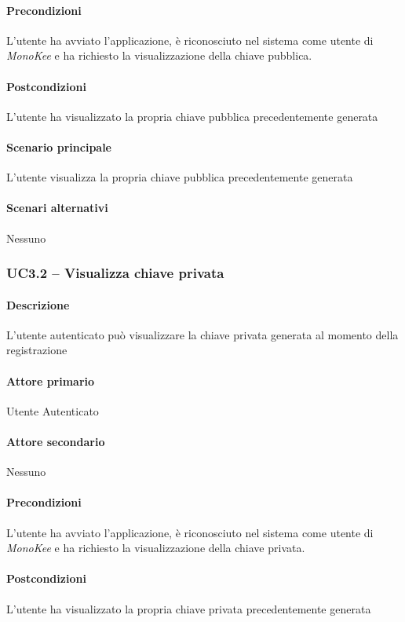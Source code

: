 \paragraph{Precondizioni}  L’utente ha avviato l’applicazione, è riconosciuto nel sistema come utente di \textit{MonoKee} e ha richiesto la visualizzazione della chiave pubblica.
\paragraph{Postcondizioni}  L’utente ha visualizzato la propria chiave pubblica precedentemente generata
\paragraph{Scenario principale}  
L’utente visualizza la propria chiave pubblica precedentemente generata
\paragraph{Scenari alternativi}  Nessuno



\subsubsection{UC3.2 – Visualizza chiave privata}
\paragraph{Descrizione}  L’utente autenticato può visualizzare la chiave privata generata al momento della registrazione
\paragraph{Attore primario}  Utente Autenticato
\paragraph{Attore secondario}  Nessuno
\paragraph{Precondizioni}  L’utente ha avviato l’applicazione, è riconosciuto nel sistema come utente di \textit{MonoKee} e ha richiesto la visualizzazione della chiave privata.
\paragraph{Postcondizioni}  L’utente ha visualizzato la propria chiave privata precedentemente generata
